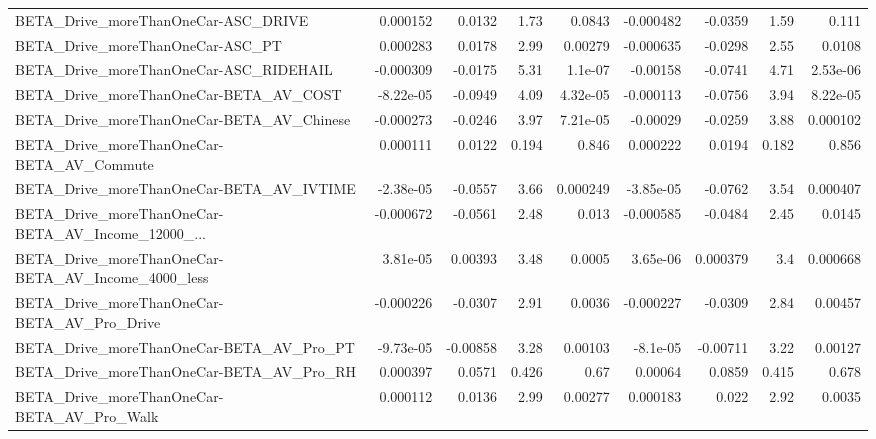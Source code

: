 \begin{tabular}{lrrrrrrrr}
BETA\_Drive\_moreThanOneCar-ASC\_DRIVE                &    0.000152 &       0.0132 &      1.73 &   0.0843 &  -0.000482 &     -0.0359 &         1.59 &         0.111 \\
BETA\_Drive\_moreThanOneCar-ASC\_PT                   &    0.000283 &       0.0178 &      2.99 &  0.00279 &  -0.000635 &     -0.0298 &         2.55 &        0.0108 \\
BETA\_Drive\_moreThanOneCar-ASC\_RIDEHAIL             &   -0.000309 &      -0.0175 &      5.31 &  1.1e-07 &   -0.00158 &     -0.0741 &         4.71 &      2.53e-06 \\
BETA\_Drive\_moreThanOneCar-BETA\_AV\_COST             &   -8.22e-05 &      -0.0949 &      4.09 & 4.32e-05 &  -0.000113 &     -0.0756 &         3.94 &      8.22e-05 \\
BETA\_Drive\_moreThanOneCar-BETA\_AV\_Chinese          &   -0.000273 &      -0.0246 &      3.97 & 7.21e-05 &   -0.00029 &     -0.0259 &         3.88 &      0.000102 \\
BETA\_Drive\_moreThanOneCar-BETA\_AV\_Commute          &    0.000111 &       0.0122 &     0.194 &    0.846 &   0.000222 &      0.0194 &        0.182 &         0.856 \\
BETA\_Drive\_moreThanOneCar-BETA\_AV\_IVTIME           &   -2.38e-05 &      -0.0557 &      3.66 & 0.000249 &  -3.85e-05 &     -0.0762 &         3.54 &      0.000407 \\
BETA\_Drive\_moreThanOneCar-BETA\_AV\_Income\_12000\_... &   -0.000672 &      -0.0561 &      2.48 &    0.013 &  -0.000585 &     -0.0484 &         2.45 &        0.0145 \\
BETA\_Drive\_moreThanOneCar-BETA\_AV\_Income\_4000\_less &    3.81e-05 &      0.00393 &      3.48 &   0.0005 &   3.65e-06 &    0.000379 &          3.4 &      0.000668 \\
BETA\_Drive\_moreThanOneCar-BETA\_AV\_Pro\_Drive        &   -0.000226 &      -0.0307 &      2.91 &   0.0036 &  -0.000227 &     -0.0309 &         2.84 &       0.00457 \\
BETA\_Drive\_moreThanOneCar-BETA\_AV\_Pro\_PT           &   -9.73e-05 &     -0.00858 &      3.28 &  0.00103 &   -8.1e-05 &    -0.00711 &         3.22 &       0.00127 \\
BETA\_Drive\_moreThanOneCar-BETA\_AV\_Pro\_RH           &    0.000397 &       0.0571 &     0.426 &     0.67 &    0.00064 &      0.0859 &        0.415 &         0.678 \\
BETA\_Drive\_moreThanOneCar-BETA\_AV\_Pro\_Walk         &    0.000112 &       0.0136 &      2.99 &  0.00277 &   0.000183 &       0.022 &         2.92 &        0.0035 \\

\end{tabular}
